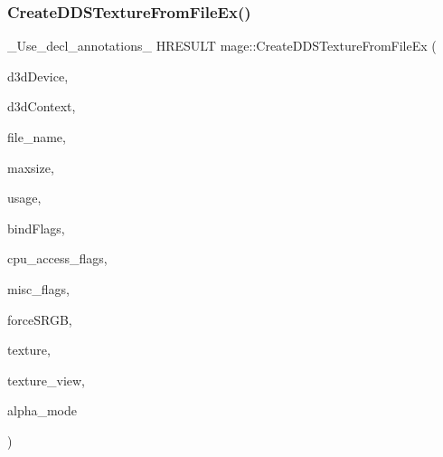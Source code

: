\subsubsection{\texorpdfstring{Create\+D\+D\+S\+Texture\+From\+File\+Ex()}{CreateDDSTextureFromFileEx()}\hspace{0.1cm}{\footnotesize\ttfamily [4/4]}}
{\footnotesize\ttfamily \+\_\+\+Use\+\_\+decl\+\_\+annotations\+\_\+ H\+R\+E\+S\+U\+LT mage\+::\+Create\+D\+D\+S\+Texture\+From\+File\+Ex (\begin{DoxyParamCaption}\item[{I\+D3\+D11\+Device $\ast$}]{d3d\+Device,  }\item[{I\+D3\+D11\+Device\+Context $\ast$}]{d3d\+Context,  }\item[{const wchar\+\_\+t $\ast$}]{file\+\_\+name,  }\item[{size\+\_\+t}]{maxsize,  }\item[{D3\+D11\+\_\+\+U\+S\+A\+GE}]{usage,  }\item[{uint32\+\_\+t}]{bind\+Flags,  }\item[{uint32\+\_\+t}]{cpu\+\_\+access\+\_\+flags,  }\item[{uint32\+\_\+t}]{misc\+\_\+flags,  }\item[{bool}]{force\+S\+R\+GB,  }\item[{I\+D3\+D11\+Resource $\ast$$\ast$}]{texture,  }\item[{I\+D3\+D11\+Shader\+Resource\+View $\ast$$\ast$}]{texture\+\_\+view,  }\item[{\hyperlink{namespacemage_a0c586a2bad862f4858900ca121ca80c2}{D\+D\+S\+\_\+\+A\+L\+P\+H\+A\+\_\+\+M\+O\+DE} $\ast$}]{alpha\+\_\+mode }\end{DoxyParamCaption})}

\hypertarget{namespacemage_a43328fca7f4b8d7a25b12bac29f503dd}{}\label{namespacemage_a43328fca7f4b8d7a25b12bac29f503dd} 
